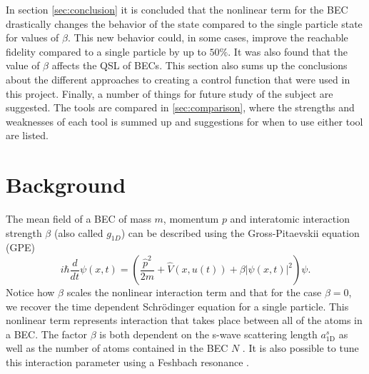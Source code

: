 \documentclass[a4paper, twocolumn]{revtex4-1}
\begin{document}
In section \ref{sec:conclusion} it is concluded that the nonlinear term for the BEC drastically changes the behavior of the state compared to the single particle state for values of $\beta$. This new behavior could, in some cases, improve the reachable fidelity compared to a single particle by up to $50\%$. It was also found that the value of $\beta$ affects the QSL of BECs. This section also sums up the conclusions about the different approaches to creating a control function that were used in this project. Finally, a number of things for future study of the subject are suggested. The tools are compared in \ref{sec:comparison}, where the strengths and weaknesses of each tool is summed up and suggestions for when to use either tool are listed.

\section{\label{sec:back}Background}
The mean field of a BEC of mass $m$, momentum $p$ and interatomic interaction strength $\beta$ (also called $g_{1D}$) can be described using the Gross-Pitaevskii equation (GPE)
\begin{equation}
	i\hbar \frac{d}{dt}\psi(x,t)= \left( \frac{\hat{p}^2}{2m} + \hat{V}(x,u(t)) + \beta |\psi(x,t)|^2 \right)\psi.
	\label{eq:Hbec}
\end{equation}
Notice how $\beta$ scales the nonlinear interaction term and that for the case $\beta=0$, we recover the time dependent Schrödinger equation for a single particle. This nonlinear term represents interaction that takes place between all of the atoms in a BEC. The factor $\beta$ is both dependent on the s-wave scattering length $a_{\text{1D}}^s$ as well as the number of atoms contained in the BEC $N$ \cite{Schmiedmayer}. It is also possible to tune this interaction parameter using a Feshbach resonance \cite{Feshbach}. \\ 
\end{document}
